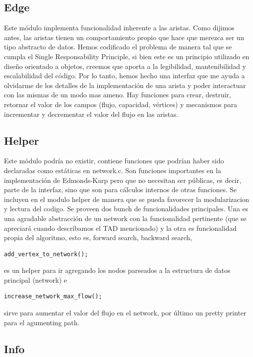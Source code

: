 \documentclass[11pt]{article}
\begin{document}
\subsection{Edge}
\label{sec-4-2}

Este módulo implementa funcionalidad inherente a las aristas.
Como dijimos antes, las aristas tienen un comportamiento propio que
hace que merezca ser un tipo abstracto de datos. Hemos codificado el
problema de manera tal que se cumpla el Single Responsability
Principle, si bien este es un principio utilizado en diseño orientado
a objetos, creemos que aporta a la legibilidad, mantenibilidad y
escalabilidad del código. Por lo tanto, hemos hecho una interfaz que
me ayuda a olvidarme de los detalles de la implementación de una
arista y poder interactuar con las mismas de un modo mas ameno. Hay
funciones para crear, destruir, retornar el valor de los campos
(flujo, capacidad, vértices) y mecanismos para incrementar y
decrementar el valor del flujo en las aristas.
\subsection{Helper}
\label{sec-4-3}

Este módulo podría no existir, contiene funciones que podrían haber
sido declaradas como estáticas en network.c. Son funciones
importantes en la implementación de Edmonds-Karp pero que no
necesitan ser públicas, es decir, parte de la interfaz, sino que son
para cálculos internos de otras funciones. Se incluyen en el
modulo helper de manera que se pueda favorecer la modularizacion y
lectura del codigo.
Se proveen dos bunch de funcionalidades principales. Una es una
agradable abstracción de un network con la funcionalidad pertinente
(que se apreciará cuando describamos el TAD mencionado) y la otra es
funcionalidad propia del algoritmo, esto es, forward search, backward
search, 

\begin{verbatim}
add_vertex_to_network();
\end{verbatim}
es un helper para ir agregando los
nodos parseados a la estructura de datos principal (network) e

\begin{verbatim}
increase_network_max_flow();
\end{verbatim}
sirve para aumentar el valor del flujo en
el network, por último un pretty printer para el agumenting path.
\subsection{Info}
\label{sec-4-4}
\end{document}

